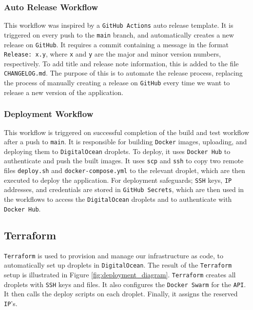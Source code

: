 \subsubsection{Auto Release Workflow}
This workflow was inspired by a \texttt{GitHub Actions} auto release template\cite{auto-release}.
It is triggered on every push to the \texttt{main} branch, and automatically 
creates a new release on \texttt{GitHub}.
It requires a commit containing a message in the format \texttt{Release: x.y}, 
where \texttt{x} and \texttt{y} are the major and minor version numbers, respectively.
To add title and release note information, this is added to the file \texttt{CHANGELOG.md}.
The purpose of this is to automate the release process, replacing the process 
of manually creating a release on \texttt{GitHub} every time we want to release a new version 
of the application.

\subsubsection{Deployment Workflow}
This workflow is triggered on successful completion of the build and test workflow 
after a push to \texttt{main}.
It is responsible for building \texttt{Docker} images, uploading, and deploying them to 
\texttt{DigitalOcean} droplets.
To deploy, it uses \texttt{Docker Hub} to authenticate and push the built images.
It uses \texttt{scp} and \texttt{ssh} to copy two remote files \texttt{deploy.sh} 
and \texttt{docker-compose.yml} to the relevant droplet,
which are then executed to deploy the application.
For deployment safeguards; \texttt{SSH} keys, \texttt{IP} addresses, and credentials are stored in \texttt{GitHub Secrets},
which are then used in the workflows to access the \texttt{DigitalOcean} droplets and to 
authenticate with \texttt{Docker Hub}.


\subsection{Terraform}
\texttt{Terraform} is used to provision and manage our infrastructure as code, 
to automatically set up droplets in \texttt{DigitalOcean}. 
The result of the \texttt{Terraform} setup is illustrated 
in Figure \ref{fig:deployment_diagram}.
\texttt{Terraform} creates all droplets with \texttt{SSH} keys and files.
It also configures the \texttt{Docker Swarm} for the \texttt{API}.
It then calls the deploy scripts on each droplet.
Finally, it assigns the reserved \texttt{IP}'s.

